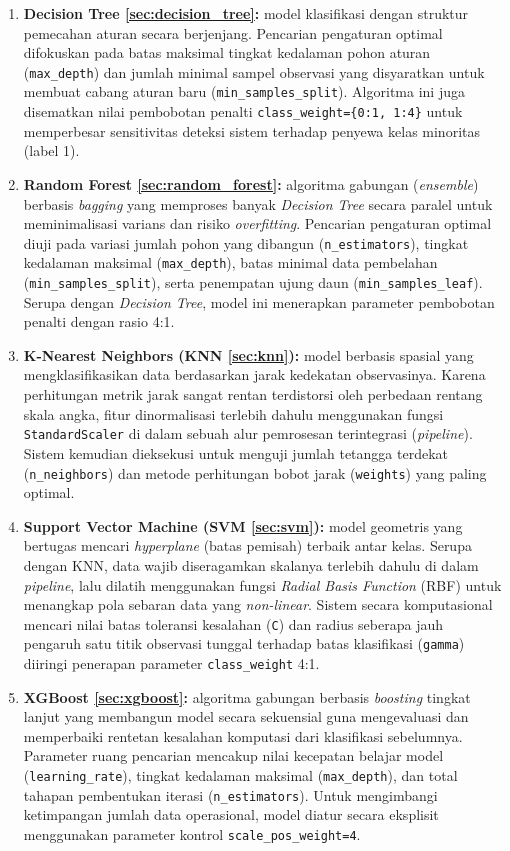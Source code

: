 \begin{enumerate}
    \item \textbf{Decision Tree \ref{sec:decision_tree}:} model klasifikasi dengan struktur pemecahan aturan secara berjenjang. Pencarian pengaturan optimal difokuskan pada batas maksimal tingkat kedalaman pohon aturan (\texttt{max\_depth}) dan jumlah minimal sampel observasi yang disyaratkan untuk membuat cabang aturan baru (\texttt{min\_samples\_split}). Algoritma ini juga disematkan nilai pembobotan penalti \texttt{class\_weight=\{0:1, 1:4\}} untuk memperbesar sensitivitas deteksi sistem terhadap penyewa kelas minoritas (label 1).
    \item \textbf{Random Forest \ref{sec:random_forest}:} algoritma gabungan (\textit{ensemble}) berbasis \textit{bagging} yang memproses banyak \textit{Decision Tree} secara paralel untuk meminimalisasi varians dan risiko \textit{overfitting}. Pencarian pengaturan optimal diuji pada variasi jumlah pohon yang dibangun (\texttt{n\_estimators}), tingkat kedalaman maksimal (\texttt{max\_depth}), batas minimal data pembelahan (\texttt{min\_samples\_split}), serta penempatan ujung daun (\texttt{min\_samples\_leaf}). Serupa dengan \textit{Decision Tree}, model ini menerapkan parameter pembobotan penalti dengan rasio 4:1.
    \item \textbf{K-Nearest Neighbors (KNN \ref{sec:knn}):} model berbasis spasial yang mengklasifikasikan data berdasarkan jarak kedekatan observasinya. Karena perhitungan metrik jarak sangat rentan terdistorsi oleh perbedaan rentang skala angka, fitur dinormalisasi terlebih dahulu menggunakan fungsi \texttt{StandardScaler} di dalam sebuah alur pemrosesan terintegrasi (\textit{pipeline}). Sistem kemudian dieksekusi untuk menguji jumlah tetangga terdekat (\texttt{n\_neighbors}) dan metode perhitungan bobot jarak (\texttt{weights}) yang paling optimal.
    \item \textbf{Support Vector Machine (SVM \ref{sec:svm}):} model geometris yang bertugas mencari \textit{hyperplane} (batas pemisah) terbaik antar kelas. Serupa dengan KNN, data wajib diseragamkan skalanya terlebih dahulu di dalam \textit{pipeline}, lalu dilatih menggunakan fungsi \textit{Radial Basis Function} (RBF) untuk menangkap pola sebaran data yang \textit{non-linear}. Sistem secara komputasional mencari nilai batas toleransi kesalahan (\texttt{C}) dan radius seberapa jauh pengaruh satu titik observasi tunggal terhadap batas klasifikasi (\texttt{gamma}) diiringi penerapan parameter \texttt{class\_weight} 4:1.
    \item \textbf{XGBoost \ref{sec:xgboost}:} algoritma gabungan berbasis \textit{boosting} tingkat lanjut yang membangun model secara sekuensial guna mengevaluasi dan memperbaiki rentetan kesalahan komputasi dari klasifikasi sebelumnya. Parameter ruang pencarian mencakup nilai kecepatan belajar model (\texttt{learning\_rate}), tingkat kedalaman maksimal (\texttt{max\_depth}), dan total tahapan pembentukan iterasi (\texttt{n\_estimators}). Untuk mengimbangi ketimpangan jumlah data operasional, model diatur secara eksplisit menggunakan parameter kontrol \texttt{scale\_pos\_weight=4}.
\end{enumerate}

